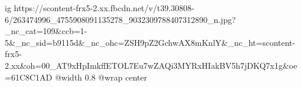  
 
 
 
 

\ifcmt
  ig https://scontent-frx5-2.xx.fbcdn.net/v/t39.30808-6/263474996_4755908091135278_9032309788407312890_n.jpg?_nc_cat=109&ccb=1-5&_nc_sid=b9115d&_nc_ohc=ZSH9pZ2GchwAX8mKnlY&_nc_ht=scontent-frx5-2.xx&oh=00_AT9xHpImkffETOL7Eu7wZAQi3MYRxHIakBV5h7jDKQ7x1g&oe=61C8C1AD
  @width 0.8
	@wrap center
\fi

\begin{center}
\end{center}
